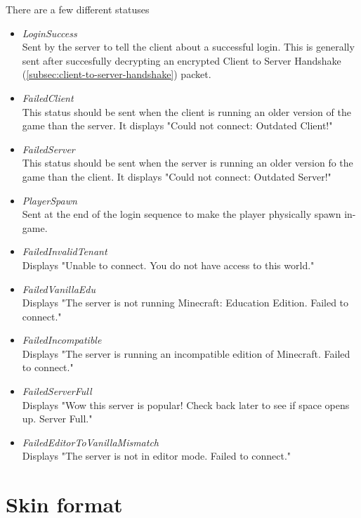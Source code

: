 There are a few different statuses
\begin{itemize}
    \item \textit{LoginSuccess} \\
        Sent by the server to tell the client about a successful login. This is generally sent after succesfully decrypting an encrypted Client to Server Handshake (\ref{subsec:client-to-server-handshake}) packet.

    \item \textit{FailedClient} \\
        This status should be sent when the client is running an older version of the game than the server.
        It displays "Could not connect: Outdated Client!"

    \item \textit{FailedServer} \\
        This status should be sent when the server is running an older version fo the game than the client.
        It displays "Could not connect: Outdated Server!"

    \item \textit{PlayerSpawn} \\
        Sent at the end of the login sequence to make the player physically spawn in-game.

    \item \textit{FailedInvalidTenant} \\
        Displays "Unable to connect. You do not have access to this world."

    \item \textit{FailedVanillaEdu} \\
        Displays "The server is not running Minecraft: Education Edition. Failed to connect."

    \item \textit{FailedIncompatible} \\
        Displays "The server is running an incompatible edition of Minecraft. Failed to connect."
    
    \item \textit{FailedServerFull} \\
        Displays "Wow this server is popular! Check back later to see if space opens up. Server Full."

    \item \textit{FailedEditorToVanillaMismatch} \\
        Displays "The server is not in editor mode. Failed to connect."
\end{itemize}

\section{Skin format}\label{sec:protocol-skin}